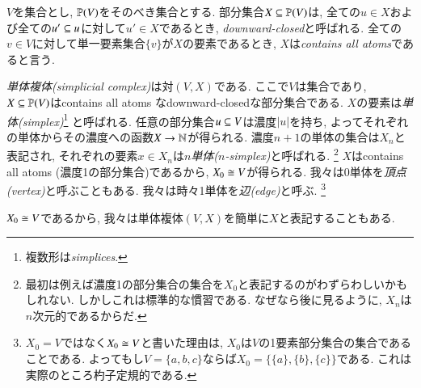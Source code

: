 \begin{definition}\label{def:simplicial complex}


$V$を集合とし, $\PP(V)$をそのべき集合とする. 部分集合$X\ss\PP(V)$は, 全ての$u\in X$および全ての$u'\ss u$に対して$u'\in X$であるとき, \emph{downward-closed}と呼ばれる. 全ての$v\in V$に対して単一要素集合$\{v\}$が$X$の要素であるとき, $X$は\emph{contains all atoms}であると言う.


\emph{単体複体(simplicial complex)}は対$(V,X)$である. ここで$V$は集合であり, $X\ss\PP(V)$はcontains all atoms なdownward-closedな部分集合である. $X$の要素は\emph{単体(simplex)}\footnote{複数形は\emph{simplices}.}
と呼ばれる. 任意の部分集合$u\ss V$は濃度$|u|$を持ち, よってそれぞれの単体からその濃度への函数$X\to\NN$が得られる. 濃度$n+1$の単体の集合は$X_n$と表記され, それぞれの要素$x\in X_n$は\emph{$n$単体($n$-simplex)}と呼ばれる.
\footnote{最初は例えば濃度1の部分集合の集合を$X_0$と表記するのがわずらわしいかもしれない. しかしこれは標準的な慣習である. なぜなら後に見るように, $X_n$は$n$次元的であるからだ.}
$X$はcontains all atoms (濃度1の部分集合)であるから, $X_0\iso V$が得られる. 我々は0単体を\emph{頂点(vertex)}と呼ぶこともある. 我々は時々1単体を\emph{辺(edge)}と呼ぶ.
\footnote{$X_0=V$ではなく$X_0\iso V$と書いた理由は, $X_0$は$V$の1要素部分集合の集合であることである. よってもし$V=\{a,b,c\}$ならば$X_0=\{\{a\},\{b\},\{c\}\}$である. これは実際のところ杓子定規的である.}


$X_0\iso V$であるから, 我々は単体複体$(V,X)$を簡単に$X$と表記することもある.

\end{definition}

